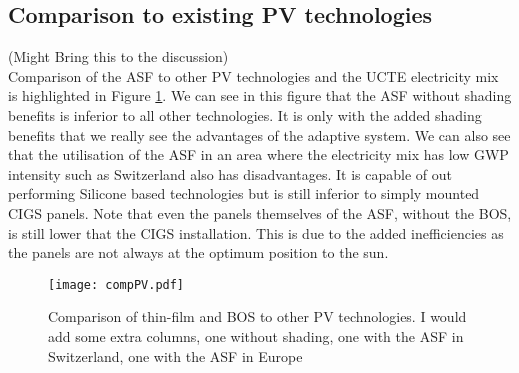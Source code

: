 


\subsection{Comparison to existing PV technologies}

(Might Bring this to the discussion)\\
Comparison of the ASF to other PV technologies and the UCTE electricity mix is highlighted in Figure \ref{fig:compPV}. We can see in this figure that the ASF without shading benefits is inferior to all other technologies. It is only with the added shading benefits that we really see the advantages of the adaptive system. 
We can also see that the utilisation of the ASF in an area where the electricity mix has low GWP intensity such as Switzerland also has disadvantages. It is capable of out performing Silicone based technologies but is still inferior to simply mounted CIGS panels. Note that even the panels themselves of the ASF, without the BOS, is still lower that the CIGS installation. This is due to the added inefficiencies as the panels are not always at the optimum position to the sun.


\begin{figure}[H]
\begin{center}
\texttt{[image: compPV.pdf]}
\caption{Comparison of thin-film and BOS to other PV technologies. I would add some extra columns, one without shading, one with the ASF in Switzerland, one with the ASF in Europe}
\label{fig:compPV}
\end{center}
\end{figure}





